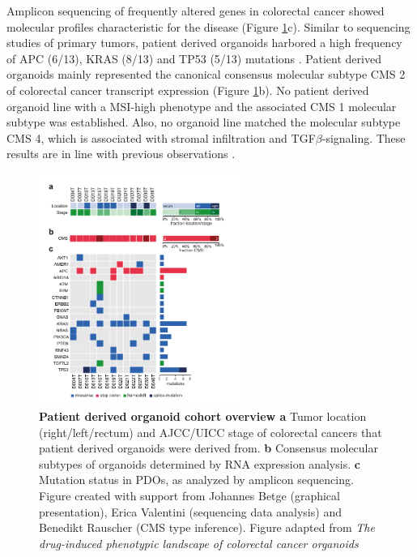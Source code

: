 \begin{flushleft}
\bigbreak
Amplicon sequencing of frequently altered genes in colorectal cancer showed molecular profiles characteristic for the disease (Figure \ref{fig_120}c). Similar to sequencing studies of primary tumors, patient derived organoids harbored a high frequency of APC (6/13), KRAS (8/13) and TP53 (5/13) mutations \citep{Muzny2012-hr}. Patient derived organoids mainly represented the canonical consensus molecular subtype CMS 2 of colorectal cancer transcript expression \citep{Guinney2015-ex} (Figure \ref{fig_120}b). No patient derived organoid line with a MSI-high phenotype and the associated CMS 1 molecular subtype was established. Also, no organoid line matched the molecular subtype CMS 4, which is associated with stromal infiltration and TGF\(\beta\)-signaling. These results are in line with previous observations \citep{Van_De_Wetering2015-ko, Schutte2017-fl}.

\begin{figure}[!h]
\centering
\includegraphics[width=250,
                height=\textheight,
                keepaspectratio]{figures/promise/pdf/fig_1_0.pdf}
\caption[Patient derived organoid cohort overview]{\textbf{Patient derived organoid cohort overview a} Tumor location (right/left/rectum) and AJCC/UICC stage of colorectal cancers that patient derived organoids were derived from. \textbf{b}  Consensus molecular subtypes of organoids determined by RNA expression analysis. \textbf{c} Mutation status in PDOs, as analyzed by amplicon sequencing. Figure created with support from Johannes Betge (graphical presentation),  Erica Valentini (sequencing data analysis) and Benedikt Rauscher (CMS type inference). Figure adapted from \textit{The drug-induced phenotypic landscape of colorectal cancer organoids} \citep{Betge2022-kr}}
\label{fig_120}
\end{figure}



\end{flushleft}
